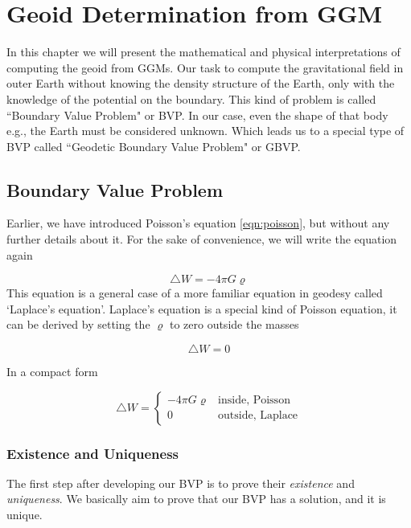 \chapter{Geoid Determination from GGM}

In this chapter we will present the mathematical and physical interpretations of computing the geoid from GGMs. Our task to compute the gravitational field in outer Earth without knowing the density structure of the Earth, only with the knowledge of the potential on the boundary. This kind of problem is called ``Boundary Value Problem" or BVP. In our case, even the shape of that body e.g., the Earth must be considered unknown. Which leads us to a special type of BVP called ``Geodetic Boundary Value Problem" or GBVP.

\section{Boundary Value Problem}

Earlier, we have introduced Poisson's equation \ref{eqn:poisson}, but without any further details about it. For the sake of convenience, we will write the equation again

\begin{equation*}
\triangle W = -4 \pi G \varrho
\end{equation*} 
This equation is a general case of a more familiar equation in geodesy called `Laplace's equation'. Laplace's equation is a special kind of Poisson equation, it can be derived by setting the $\varrho$ to zero outside the masses

\begin{equation}
\label{eqn:laplace}
\triangle W = 0
\end{equation}

In a compact form 

\begin{equation}
\triangle W = 
\begin{cases}
-4 \pi G \varrho & \text{inside, Poisson} \\
0 & \text{outside, Laplace}
\end{cases}
\end{equation}




\subsection{Existence and Uniqueness}

The first step after developing our BVP is to prove their \textit{existence} and \textit{uniqueness}. We basically aim to prove that our BVP has a solution, and it is unique.

